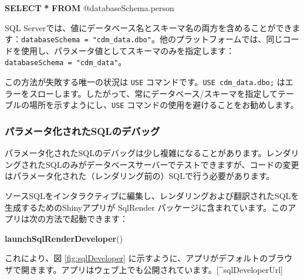 \documentclass[
  11pt]{book}
\newenvironment{Shaded}{\begin{snugshade}}{\end{snugshade}}
\newcommand{\FunctionTok}[1]{\textcolor[rgb]{0.13,0.29,0.53}{\textbf{#1}}}
\newcommand{\KeywordTok}[1]{\textcolor[rgb]{0.13,0.29,0.53}{\textbf{#1}}}
\newcommand{\NormalTok}[1]{#1}
\newcommand{\OperatorTok}[1]{\textcolor[rgb]{0.81,0.36,0.00}{\textbf{#1}}}
\theoremstyle{definition}
\theoremstyle{definition}
\theoremstyle{definition}
\theoremstyle{definition}
\theoremstyle{remark}
\begin{document}
\begin{Shaded}
\begin{Highlighting}[]
\KeywordTok{SELECT} \OperatorTok{*} \KeywordTok{FROM}\NormalTok{ @databaseSchema.person}
\end{Highlighting}
\end{Shaded}

SQL Serverでは、値にデータベース名とスキーマ名の両方を含めることができます：\texttt{databaseSchema\ =\ "cdm\_data.dbo"}。他のプラットフォームでは、同じコードを使用し、パラメータ値としてスキーマのみを指定します：\texttt{databaseSchema\ =\ "cdm\_data"}。

この方法が失敗する唯一の状況は \texttt{USE} コマンドです。\texttt{USE\ cdm\_data.dbo;} はエラーをスローします。したがって、常にデータベース/スキーマを指定してテーブルの場所を示すようにし、\texttt{USE} コマンドの使用を避けることをお勧めします。

\subsubsection*{パラメータ化されたSQLのデバッグ}\label{ux30d1ux30e9ux30e1ux30fcux30bfux5316ux3055ux308cux305fsqlux306eux30c7ux30d0ux30c3ux30b0}

パラメータ化されたSQLのデバッグは少し複雑になることがあります。レンダリングされたSQLのみがデータベースサーバーでテストできますが、コードの変更はパラメータ化された（レンダリング前の）SQLで行う必要があります。 

ソースSQLをインタラクティブに編集し、レンダリングおよび翻訳されたSQLを生成するためのShinyアプリが SqlRender パッケージに含まれています。このアプリは次の方法で起動できます：

\begin{Shaded}
\begin{Highlighting}[]
\FunctionTok{launchSqlRenderDeveloper}\NormalTok{()}
\end{Highlighting}
\end{Shaded}

これにより、図 \ref{fig:sqlDeveloper} に示すように、アプリがデフォルトのブラウザで開きます。アプリはウェブ上でも公開されています。{[}\^{}sqlDeveloperUrl{]}
\end{document}
